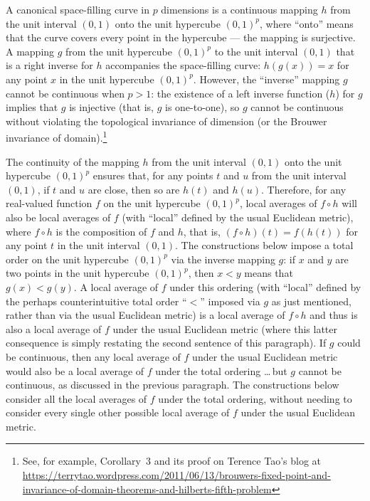 \documentclass{article}
\begin{document}
A canonical space-filling curve in $p$ dimensions is a continuous mapping $h$
from the unit interval $(0, 1)$ onto the unit hypercube $(0, 1)^p$,
where ``onto'' means that the curve covers every point in the hypercube
--- the mapping is surjective.
A mapping $g$ from the unit hypercube $(0, 1)^p$
to the unit interval $(0, 1)$ that is a right inverse for $h$
accompanies the space-filling curve: $h(g(x)) = x$
for any point $x$ in the unit hypercube $(0, 1)^p$.
However, the ``inverse'' mapping $g$ cannot be continuous when $p > 1$:
the existence of a left inverse function ($h$) for $g$
implies that $g$ is injective (that is, $g$ is one-to-one),
so $g$ cannot be continuous without violating the topological invariance
of dimension (or the Brouwer invariance of domain).\footnote{See, for example,
Corollary~3 and its proof on Terence Tao's blog at
\url{https://terrytao.wordpress.com/2011/06/13/brouwers-fixed-point-and-invariance-of-domain-theorems-and-hilberts-fifth-problem}}

The continuity of the mapping $h$ from the unit interval $(0, 1)$
onto the unit hypercube $(0, 1)^p$ ensures that,
for any points $t$ and $u$ from the unit interval $(0, 1)$,
if $t$ and $u$ are close, then so are $h(t)$ and $h(u)$.
Therefore, for any real-valued function $f$ on the unit hypercube $(0, 1)^p$,
local averages of $f \circ h$ will also be local averages of $f$
(with ``local'' defined by the usual Euclidean metric),
where $f \circ h$ is the composition of $f$ and $h$, that is,
$(f \circ h)(t) = f(h(t))$ for any point $t$ in the unit interval $(0, 1)$.
The constructions below impose a total order on the unit hypercube $(0, 1)^p$
via the inverse mapping $g$: if $x$ and $y$ are two points
in the unit hypercube $(0, 1)^p$, then $x < y$ means that $g(x) < g(y)$.
A local average of $f$ under this ordering (with ``local'' defined
by the perhaps counterintuitive total order ``$<$'' imposed via $g$
as just mentioned, rather than via the usual Euclidean metric)
is a local average of $f \circ h$ and thus is also a local average of $f$
under the usual Euclidean metric (where this latter consequence
is simply restating the second sentence of this paragraph).
If $g$ could be continuous, then any local average of $f$
under the usual Euclidean metric would also be a local average of $f$
under the total ordering \dots\,but $g$ cannot be continuous,
as discussed in the previous paragraph.
The constructions below consider all the local averages of $f$
under the total ordering, without needing to consider
every single other possible local average of $f$
under the usual Euclidean metric.
\end{document}
